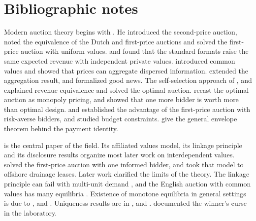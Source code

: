 




\section{Bibliographic notes}\label{sec:14-bibnotes}

Modern auction theory begins with \citet{Vickrey1961}. He introduced the second-price auction, noted the
equivalence of the Dutch and first-price auctions and solved the first-price auction with uniform values.
\citet{Vickrey1962} and \citet{OrtegaReichert1968} found that the standard formats raise the same expected
revenue with independent private values. \citet{Wilson1967,Wilson1977} introduced common values and showed that
prices can aggregate dispersed information. \citet{Milgrom1979,Milgrom1981a} extended the aggregation result,
and \citet{Milgrom1981} formalized good news. The self-selection approach of \citet{HarrisRaviv1981}, \citet{Myerson1981} and
\citet{RileySamuelson1981} explained revenue equivalence and solved the optimal auction. \citet{BulowRoberts1989}
recast the optimal auction as monopoly pricing, and \citet{BulowKlemperer1996} showed that one more bidder is worth
more than optimal design. \citet{Holt1980} and \citet{MaskinRiley1984} established the advantage of the
first-price auction with risk-averse bidders, and \citet{CheGale1998} studied budget constraints.
\citet{MilgromSegal2002} give the general envelope theorem behind the payment identity.

\citet{MilgromWeber1982} is the central paper of the field. Its affiliated values model, its linkage principle
and its disclosure results organize most later work on interdependent values. \citet{EngelbrechtWiggansMilgromWeber1983}
solved the first-price auction with one informed bidder, and \citet{HendricksPorter1988} took that model to
offshore drainage leases. Later work clarified the limits of the theory. The linkage principle can fail with
multi-unit demand \citep{PerryReny1999}, and the English auction with common values has many equilibria
\citep{BikhchandaniHaileRiley2002}. Existence of monotone equilibria in general settings is due to
\citet{Athey2001}, \citet{McAdams2003} and \citet{RenyZamir2004}. Uniqueness results are in
\citet{Lebrun1999}, \citet{MaskinRiley2003} and \citet{McAdams2007}. \citet{KagelLevin1986} documented the
winner's curse in the laboratory.

